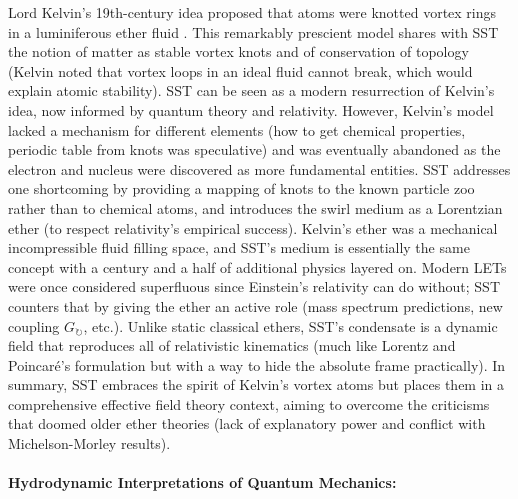 \documentclass[10pt,reprint,aps,onecolumn,nofootinbib]{revtex4-2}
\begin{document}
Lord Kelvin’s 19th-century idea proposed that atoms were knotted vortex rings in a luminiferous ether fluid \cite{Kelvin1867}. This remarkably prescient model shares with SST the notion of matter as stable vortex knots and of conservation of topology (Kelvin noted that vortex loops in an ideal fluid cannot break, which would explain atomic stability). SST can be seen as a modern resurrection of Kelvin’s idea, now informed by quantum theory and relativity. However, Kelvin’s model lacked a mechanism for different elements (how to get chemical properties, periodic table from knots was speculative) and was eventually abandoned as the electron and nucleus were discovered as more fundamental entities. SST addresses one shortcoming by providing a mapping of knots to the known particle zoo rather than to chemical atoms, and introduces the swirl medium as a Lorentzian ether (to respect relativity’s empirical success). Kelvin’s ether was a mechanical incompressible fluid filling space, and SST’s medium is essentially the same concept with a century and a half of additional physics layered on. Modern LETs were once considered superfluous since Einstein’s relativity can do without; SST counters that by giving the ether an active role (mass spectrum predictions, new coupling $G_{\circlearrowright}$, etc.). Unlike static classical ethers, SST’s condensate is a dynamic field that reproduces all of relativistic kinematics (much like Lorentz and Poincaré’s formulation but with a way to hide the absolute frame practically). In summary, SST embraces the spirit of Kelvin’s vortex atoms but places them in a comprehensive effective field theory context, aiming to overcome the criticisms that doomed older ether theories (lack of explanatory power and conflict with Michelson-Morley results).


\paragraph{Hydrodynamic Interpretations of Quantum Mechanics:}
\end{document}
